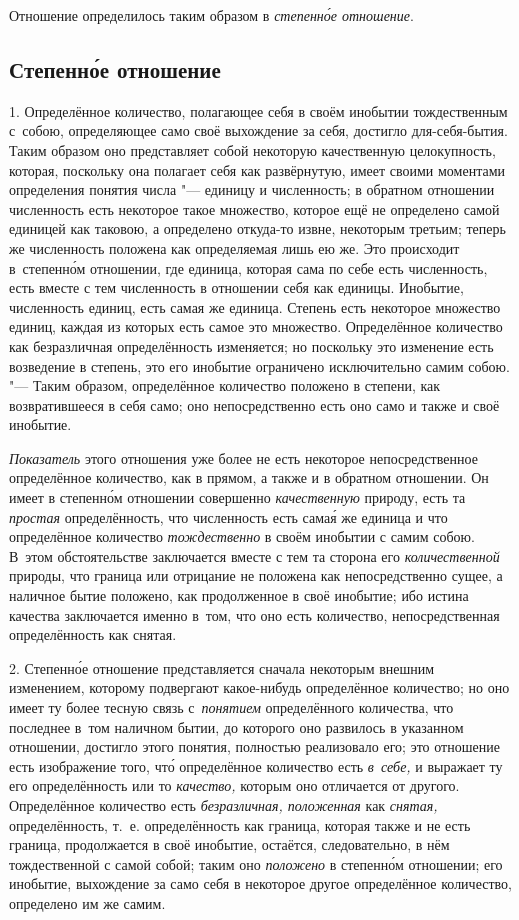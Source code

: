 Отношение определилось таким образом в {\em степенн\'{о}е отношение}.

\subsection{Степенн\'{о}е отношение}

1. Определённое количество, полагающее себя в своём инобытии тождественным
с~собою, определяющее само своё выхождение за себя, достигло для-себя-бытия.
Таким образом оно представляет собой некоторую качественную целокупность,
которая, поскольку она полагает себя как развёрнутую, имеет своими моментами
определения понятия числа "--- единицу и численность; в обратном отношении
численность есть некоторое такое множество, которое ещё не определено самой
единицей как таковою, а определено откуда-то извне, некоторым третьим; теперь
же численность положена как определяемая лишь ею же. Это происходит
в~степенн\'{о}м отношении, где единица, которая сама по себе есть численность,
есть вместе с тем численность в отношении себя как единицы. Инобытие,
численность единиц, есть самая же единица. Степень есть некоторое множество
единиц, каждая из которых есть самое это множество. Определённое количество как
безразличная определённость изменяется; но поскольку это изменение есть
возведение в степень, это его инобытие ограничено исключительно самим собою.
"--- Таким образом, определённое количество положено в степени, как
возвратившееся в себя само; оно непосредственно есть оно само и также
и своё инобытие.

{\em Показатель} этого отношения уже более не есть некоторое непосредственное
определённое количество, как в прямом, а также и в обратном отношении. Он имеет
в степенн\'{о}м отношении совершенно {\em качественную} природу, есть та
{\em простая} определённость, что численность есть сама\'{я} же единица и что
определённое количество {\em тождественно} в своём инобытии с самим собою.
В~этом обстоятельстве заключается вместе с тем та сторона его
{\em количественной} природы, что граница или отрицание не положена как
непосредственно сущее, а наличное бытие положено, как продолженное в своё
инобытие; ибо истина качества заключается именно в~том, что оно есть
количество, непосредственная определённость как снятая.

2. Степенн\'{о}е отношение представляется сначала некоторым внешним изменением,
которому подвергают какое-нибудь определённое количество; но оно имеет ту более
тесную связь с~{\em понятием} определённого количества, что последнее в~том
наличном бытии, до которого оно развилось в указанном отношении, достигло этого
понятия, полностью реализовало его; это отношение есть изображение того,
чт\'{о} определённое количество есть {\em в~себе,} и выражает ту его
определённость или то {\em качество,} которым оно отличается от другого.
Определённое количество есть {\em безразличная, положенная} как {\em снятая,}
определённость, т.~е. определённость как граница, которая также и не есть
граница, продолжается в своё инобытие, остаётся, следовательно, в нём
тождественной с самой собой; таким оно {\em положено} в степенн\'{о}м
отношении; его инобытие, выхождение за само себя в некоторое другое
определённое количество, определено им же самим.


